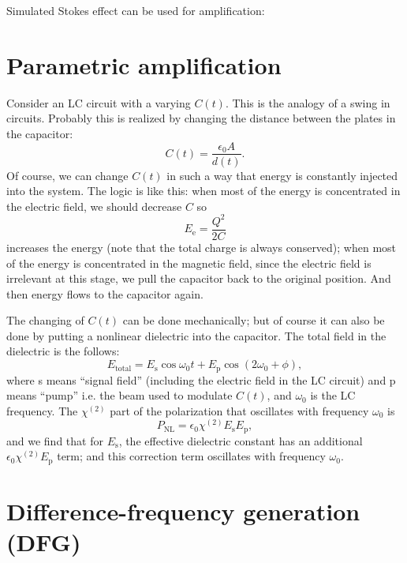 \documentclass[hyperref, a4paper]{article}
\begin{document}
Simulated Stokes effect can be used for amplification:

\section{Parametric amplification}

Consider an LC circuit with a varying $C(t)$.
This is the analogy of a swing in circuits.
Probably this is realized by changing the distance between the plates in the capacitor:
\begin{equation}
    C(t) = \frac{\epsilon_0 A}{d(t)}.
\end{equation}
Of course, we can change $C(t)$ in such a way 
that energy is constantly injected into the system.
The logic is like this:
when most of the energy is concentrated in the electric field, 
we should decrease $C$ so 
\begin{equation}
    E_\text{e} = \frac{Q^2}{2 C} 
\end{equation}
increases the energy (note that the total charge is always conserved);
when most of the energy is concentrated in the magnetic field, 
since the electric field is irrelevant at this stage, 
we pull the capacitor back to the original position.
And then energy flows to the capacitor again.

The changing of $C(t)$ can be done mechanically; 
but of course it can also be done by putting a nonlinear dielectric 
into the capacitor.
The total field in the dielectric is the follows:
\begin{equation}
    E_{\text{total}} = E_{\text{s}} \cos \omega_0 t
    + E_{\text{p}} \cos(2\omega_0 + \phi),
\end{equation}
where s means ``signal field'' (including the electric field in the LC circuit) 
and p means ``pump'' i.e. the beam used to modulate $C(t)$, 
and $\omega_0$ is the LC frequency.
The $\chi^{(2)}$ part of the polarization that oscillates  
with frequency $\omega_0$ is 
\begin{equation}
    P_{\text{NL}} = \epsilon_0 \chi^{(2)} E_{\text{s}} E_{\text{p}},
\end{equation}
and we find that for $E_{\text{s}}$, 
the effective dielectric constant has an additional $\epsilon_0 \chi^{(2)} E_{\text{p}}$ term; 
and this correction term oscillates with frequency $\omega_0$.

\section{Difference-frequency generation (DFG)}
\end{document}
